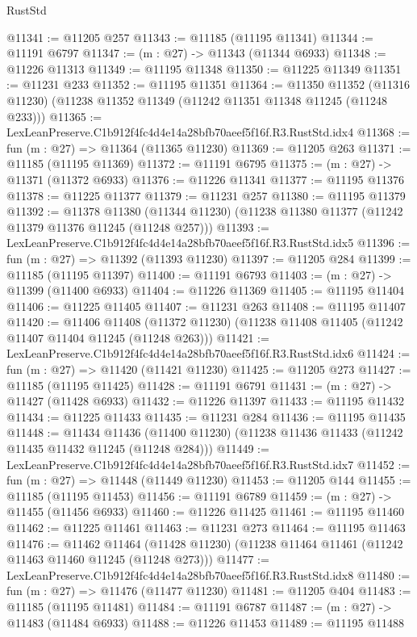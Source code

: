 \begin{lexlean}{RustStd}
\begin{coremodule}
@11341 := @11205 @257
@11343 := @11185 (@11195 @11341)
@11344 := @11191 @6797
@11347 := (m : @27) -> @11343 (@11344 @6933)
@11348 := @11226 @11313
@11349 := @11195 @11348
@11350 := @11225 @11349
@11351 := @11231 @233
@11352 := @11195 @11351
@11364 := @11350
    @11352
    (@11316 @11230)
    (@11238 @11352 @11349 (@11242 @11351 @11348 @11245 (@11248 @233)))
@11365 := LexLeanPreserve.C1b912f4fc4d4e14a28bfb70aeef5f16f.R3.RustStd.idx4
@11368 := fun (m : @27) => @11364 (@11365 @11230)
@11369 := @11205 @263
@11371 := @11185 (@11195 @11369)
@11372 := @11191 @6795
@11375 := (m : @27) -> @11371 (@11372 @6933)
@11376 := @11226 @11341
@11377 := @11195 @11376
@11378 := @11225 @11377
@11379 := @11231 @257
@11380 := @11195 @11379
@11392 := @11378
    @11380
    (@11344 @11230)
    (@11238 @11380 @11377 (@11242 @11379 @11376 @11245 (@11248 @257)))
@11393 := LexLeanPreserve.C1b912f4fc4d4e14a28bfb70aeef5f16f.R3.RustStd.idx5
@11396 := fun (m : @27) => @11392 (@11393 @11230)
@11397 := @11205 @284
@11399 := @11185 (@11195 @11397)
@11400 := @11191 @6793
@11403 := (m : @27) -> @11399 (@11400 @6933)
@11404 := @11226 @11369
@11405 := @11195 @11404
@11406 := @11225 @11405
@11407 := @11231 @263
@11408 := @11195 @11407
@11420 := @11406
    @11408
    (@11372 @11230)
    (@11238 @11408 @11405 (@11242 @11407 @11404 @11245 (@11248 @263)))
@11421 := LexLeanPreserve.C1b912f4fc4d4e14a28bfb70aeef5f16f.R3.RustStd.idx6
@11424 := fun (m : @27) => @11420 (@11421 @11230)
@11425 := @11205 @273
@11427 := @11185 (@11195 @11425)
@11428 := @11191 @6791
@11431 := (m : @27) -> @11427 (@11428 @6933)
@11432 := @11226 @11397
@11433 := @11195 @11432
@11434 := @11225 @11433
@11435 := @11231 @284
@11436 := @11195 @11435
@11448 := @11434
    @11436
    (@11400 @11230)
    (@11238 @11436 @11433 (@11242 @11435 @11432 @11245 (@11248 @284)))
@11449 := LexLeanPreserve.C1b912f4fc4d4e14a28bfb70aeef5f16f.R3.RustStd.idx7
@11452 := fun (m : @27) => @11448 (@11449 @11230)
@11453 := @11205 @144
@11455 := @11185 (@11195 @11453)
@11456 := @11191 @6789
@11459 := (m : @27) -> @11455 (@11456 @6933)
@11460 := @11226 @11425
@11461 := @11195 @11460
@11462 := @11225 @11461
@11463 := @11231 @273
@11464 := @11195 @11463
@11476 := @11462
    @11464
    (@11428 @11230)
    (@11238 @11464 @11461 (@11242 @11463 @11460 @11245 (@11248 @273)))
@11477 := LexLeanPreserve.C1b912f4fc4d4e14a28bfb70aeef5f16f.R3.RustStd.idx8
@11480 := fun (m : @27) => @11476 (@11477 @11230)
@11481 := @11205 @404
@11483 := @11185 (@11195 @11481)
@11484 := @11191 @6787
@11487 := (m : @27) -> @11483 (@11484 @6933)
@11488 := @11226 @11453
@11489 := @11195 @11488

\end{coremodule}
\end{lexlean}
